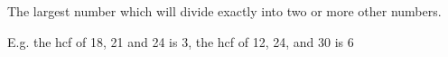 The largest number which will divide exactly into two or more other numbers.

\par
E.g. the hcf of 18, 21 and 24 is 3,
     the hcf of 12, 24, and 30 is 6